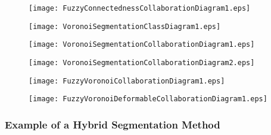 \begin{figure}
\center
\texttt{[image: FuzzyConnectednessCollaborationDiagram1.eps]}
\label{fig:UMLCollaborationDiagramoftheFuzzyConnectednessFilter}
\end{figure}

\begin{figure}
\center
\texttt{[image: VoronoiSegmentationClassDiagram1.eps]}
\label{fig:UMLVoronoiSegmentationClassFilter}
\end{figure}

\begin{figure}
\center
\texttt{[image: VoronoiSegmentationCollaborationDiagram1.eps]}
\label{fig:UMLClassesforImplementationofVoronoiDiagramFilter}
\end{figure}


\begin{figure}
\center
\texttt{[image: VoronoiSegmentationCollaborationDiagram2.eps]}
\label{fig:UMLCollaborationDiagramoftheVoronoiSegmentationFilter}
\end{figure}


\begin{figure}
\center
\texttt{[image: FuzzyVoronoiCollaborationDiagram1.eps]}
\label{fig:UMLHybridMethodDiagram1}
\end{figure}

\begin{figure}
\center
\texttt{[image: FuzzyVoronoiDeformableCollaborationDiagram1.eps]}
\label{fig:UMLHybridMethodDiagram2}
\end{figure}



\subsubsection{Example of a Hybrid Segmentation Method}
\label{sec:HybridMethod1:Example}

